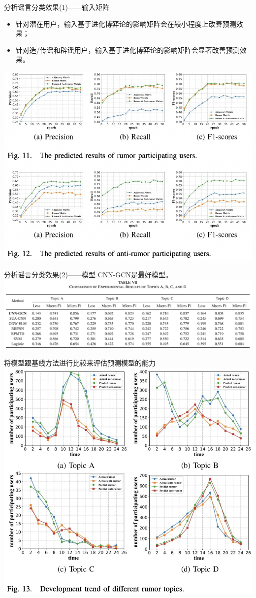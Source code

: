 \documentclass{beamer}
\begin{document}
\begin{frame}{分析谣言分类效果(1)——输入矩阵}
	\begin{itemize}
		\item 针对潜在用户，输入基于进化博弈论的影响矩阵会在较小程度上改善预测效果；
		\item 针对造/传谣和辟谣用户，输入基于进化博弈论的影响矩阵会显著改善预测效果。
	\end{itemize}
	\includegraphics[width=0.6\linewidth]{Assets/图11_图12.png}
\end{frame}

\begin{frame}{分析谣言分类效果(2)——模型}
	CNN-GCN是最好模型。\\
	\includegraphics[width=\linewidth]{Assets/表7.png}
\end{frame}

\begin{frame}{将模型跟基线方法进行比较来评估预测模型的能力}
	\includegraphics[width=0.8\linewidth]{Assets/图13.png}
\end{frame}
\end{document}

